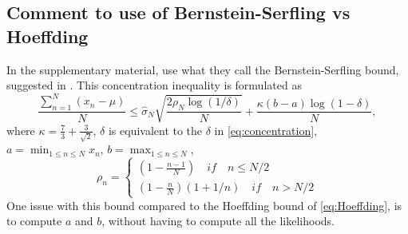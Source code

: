 \subsection{Comment to use of Bernstein-Serfling vs Hoeffding}
In the supplementary material, \cite{Bardenet:1} use what they call the Bernstein-Serfling bound, suggested in \cite{bardenet2015concentration}. This concentration inequality is formulated as 
\begin{equation}
    \frac{\sum_{n = 1}^N \left(x_n - \mu\right)}{N} \leq \hat{\sigma}_N \sqrt{\frac{2\rho_N\log\left(1/\delta\right)}{N}} + \frac{\kappa \left(b-a\right)\log\left(1 - \delta\right)}{N},
\end{equation}{}
where $\kappa = \frac{7}{3} + \frac{3}{\sqrt{2}}$, $\delta$ is equivalent to the $\delta$ in \eqref{eq:concentration}, $a = \min_{1\leq n \leq N} x_n$, $b= \max_{1 \leq n \leq N}$, 
\begin{equation}
    \rho_n =
    \begin{cases}
    \left(1 - \frac{n-1}{N}\right) \quad if \quad n \leq N/2\\
    \left(1  - \frac{n}{N}\right) \left(1 + 1/n\right) \quad if \quad n > N/2
    \end{cases}
\end{equation}
One issue with this bound compared to the Hoeffding bound of \eqref{eq:Hoeffding}, is to compute $a$ and $b$, without having to compute all the likelihoods. 
